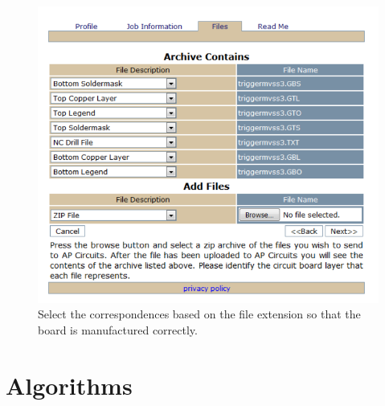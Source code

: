 \documentclass{report}
\begin{document}
	\begin{figure}[H]
		\centering
		\includegraphics[scale = 0.7]{../figures/PCBorder2.PNG}
		\caption{Select the correspondences based on the file extension so that the board is manufactured correctly.}
		\label{fig:pinouts}
	\end{figure}
	
	\appendix
	\chapter{Algorithms}
	
\end{document}
